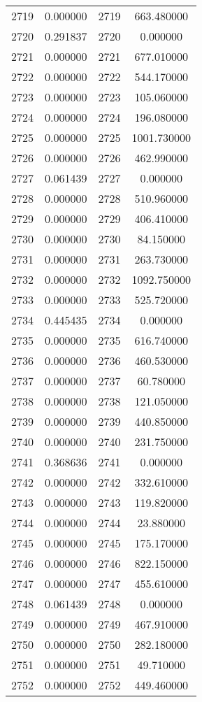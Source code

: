 \documentclass[12pt]{article}
\begin{document}
\begin{longtable}{@{}cccc@{}}
2719 & 0.000000 & 2719 & 663.480000 \\
2720 & 0.291837 & 2720 & 0.000000 \\
2721 & 0.000000 & 2721 & 677.010000 \\
2722 & 0.000000 & 2722 & 544.170000 \\
2723 & 0.000000 & 2723 & 105.060000 \\
2724 & 0.000000 & 2724 & 196.080000 \\
2725 & 0.000000 & 2725 & 1001.730000 \\
2726 & 0.000000 & 2726 & 462.990000 \\
2727 & 0.061439 & 2727 & 0.000000 \\
2728 & 0.000000 & 2728 & 510.960000 \\
2729 & 0.000000 & 2729 & 406.410000 \\
2730 & 0.000000 & 2730 & 84.150000 \\
2731 & 0.000000 & 2731 & 263.730000 \\
2732 & 0.000000 & 2732 & 1092.750000 \\
2733 & 0.000000 & 2733 & 525.720000 \\
2734 & 0.445435 & 2734 & 0.000000 \\
2735 & 0.000000 & 2735 & 616.740000 \\
2736 & 0.000000 & 2736 & 460.530000 \\
2737 & 0.000000 & 2737 & 60.780000 \\
2738 & 0.000000 & 2738 & 121.050000 \\
2739 & 0.000000 & 2739 & 440.850000 \\
2740 & 0.000000 & 2740 & 231.750000 \\
2741 & 0.368636 & 2741 & 0.000000 \\
2742 & 0.000000 & 2742 & 332.610000 \\
2743 & 0.000000 & 2743 & 119.820000 \\
2744 & 0.000000 & 2744 & 23.880000 \\
2745 & 0.000000 & 2745 & 175.170000 \\
2746 & 0.000000 & 2746 & 822.150000 \\
2747 & 0.000000 & 2747 & 455.610000 \\
2748 & 0.061439 & 2748 & 0.000000 \\
2749 & 0.000000 & 2749 & 467.910000 \\
2750 & 0.000000 & 2750 & 282.180000 \\
2751 & 0.000000 & 2751 & 49.710000 \\
2752 & 0.000000 & 2752 & 449.460000 \\

\end{longtable}
\end{document}
